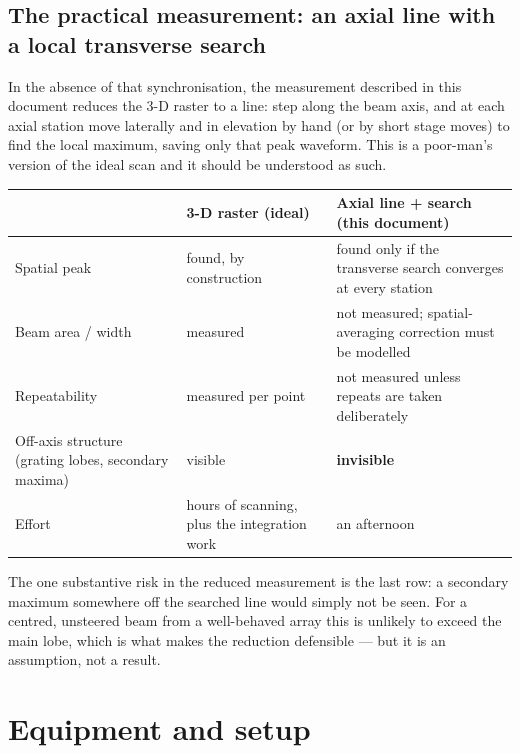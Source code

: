 \documentclass[11pt,a4paper]{article}
\newcommand{\caveat}[1]{\textcolor{orange!75!black}{\textbf{#1}}}
\begin{document}
\subsection{The practical measurement: an axial line with a local transverse search}
In the absence of that synchronisation, the measurement described in this document reduces the 3-D
raster to a line: step along the beam axis, and at each axial station move laterally and in elevation
by hand (or by short stage moves) to find the local maximum, saving only that peak waveform. This is
a poor-man's version of the ideal scan and it should be understood as such.

\begin{center}
\begin{tabular}{p{}p{}p{}}
\toprule
& \textbf{3-D raster (ideal)} & \textbf{Axial line + search (this document)} \\
\midrule
Spatial peak & found, by construction & found only if the transverse search converges at every
  station \\
Beam area / width & measured & not measured; spatial-averaging correction must be modelled \\
Repeatability & measured per point & not measured unless repeats are taken deliberately \\
Off-axis structure (grating lobes, secondary maxima) & visible & \caveat{invisible} \\
Effort & hours of scanning, plus the integration work & an afternoon \\
\bottomrule
\end{tabular}
\end{center}

\noindent
The one substantive risk in the reduced measurement is the last row: a secondary maximum somewhere
off the searched line would simply not be seen. For a centred, unsteered beam from a well-behaved
array this is unlikely to exceed the main lobe, which is what makes the reduction defensible --- but
it is an assumption, not a result.

\section{Equipment and setup}\label{sec:equipment}
\end{document}
